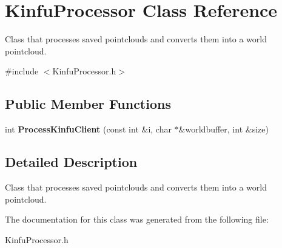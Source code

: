 \hypertarget{class_kinfu_processor}{\section{Kinfu\+Processor Class Reference}
\label{class_kinfu_processor}
}


Class that processes saved pointclouds and converts them into a world pointcloud.  




{\ttfamily \#include $<$Kinfu\+Processor.\+h$>$}

\subsection*{Public Member Functions}
\begin{DoxyCompactItemize}
\item 
\hypertarget{class_kinfu_processor_a17125ce0336fab773e0460055997ef9e}{int {\bfseries Process\+Kinfu\+Client} (const int \&i, char $\ast$\&worldbuffer, int \&size)}\label{class_kinfu_processor_a17125ce0336fab773e0460055997ef9e}

\end{DoxyCompactItemize}


\subsection{Detailed Description}
Class that processes saved pointclouds and converts them into a world pointcloud. 

The documentation for this class was generated from the following file\+:\begin{DoxyCompactItemize}
\item 
Kinfu\+Processor.\+h\end{DoxyCompactItemize}
